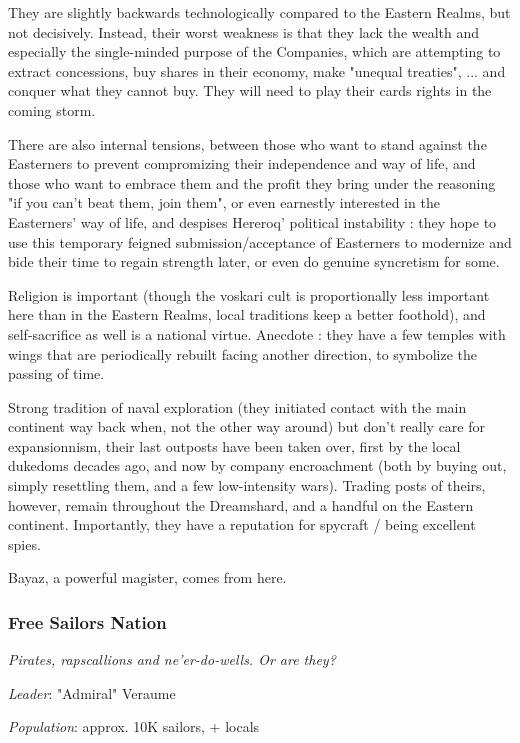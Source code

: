 They are slightly backwards technologically compared to the Eastern Realms, but not decisively. Instead, their worst weakness is that they lack the wealth and especially the single-minded purpose of the Companies, which are attempting to extract concessions, buy shares in their economy, make "unequal treaties", ... and conquer what they cannot buy. They will need to play their cards rights in the coming storm. 

There are also internal tensions, between those who want to stand against the Easterners to prevent compromizing their independence and way of life, and those who want to embrace them and the profit they bring under the reasoning "if you can't beat them, join them", or even earnestly interested in the Easterners' way of life, and despises Hereroq' political instability : they hope to use this temporary feigned submission/acceptance of Easterners to modernize and bide their time to regain strength later, or even do genuine syncretism for some.

Religion is important (though the voskari cult is proportionally less important here than in the Eastern Realms, local traditions keep a better foothold), and self-sacrifice as well is a national virtue. Anecdote : they have a few temples with wings that are periodically rebuilt facing another direction, to symbolize the passing of time.

Strong tradition of naval exploration (they initiated contact with the main continent way back when, not the other way around) but don't really care for expansionnism, their last outposts have been taken over, first by the local dukedoms decades ago, and now by company encroachment (both by buying out, simply resettling them, and a few low-intensity wars). Trading posts of theirs, however, remain throughout the Dreamshard, and a handful on the Eastern continent. Importantly, they have a reputation for spycraft / being excellent spies.

Bayaz, a powerful magister, comes from here.


\subsubsection{Free Sailors Nation}

\textit{Pirates, rapscallions and ne'er-do-wells. Or are they?}

\textit{Leader}: "Admiral" Veraume

\textit{Population}: approx. 10K sailors, + locals

